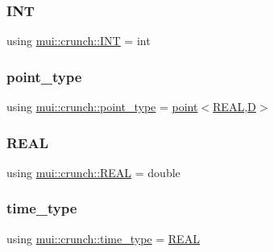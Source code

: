 \subsubsection{\texorpdfstring{I\+NT}{INT}}
{\footnotesize\ttfamily using \hyperlink{structmui_1_1crunch_a85f2c6d604af24d375168cd481228b70}{mui\+::crunch\+::\+I\+NT} =  int}

\mbox{\label{structmui_1_1crunch_ae91784f5fa63d0dea1dcb4f37fe59ff5}} 
\subsubsection{\texorpdfstring{point\+\_\+type}{point\_type}}
{\footnotesize\ttfamily using \hyperlink{structmui_1_1crunch_ae91784f5fa63d0dea1dcb4f37fe59ff5}{mui\+::crunch\+::point\+\_\+type} =  \hyperlink{structmui_1_1point}{point}$<$\hyperlink{structmui_1_1crunch_a6f2cbcc30446f242a8e0a99400d29b69}{R\+E\+AL},\hyperlink{structmui_1_1crunch_afa49250ca88779f6d39c0ab585120c2b}{D}$>$}

\mbox{\label{structmui_1_1crunch_a6f2cbcc30446f242a8e0a99400d29b69}} 
\subsubsection{\texorpdfstring{R\+E\+AL}{REAL}}
{\footnotesize\ttfamily using \hyperlink{structmui_1_1crunch_a6f2cbcc30446f242a8e0a99400d29b69}{mui\+::crunch\+::\+R\+E\+AL} =  double}

\mbox{\label{structmui_1_1crunch_a6967823168cabd179daab1d81f817eba}} 
\subsubsection{\texorpdfstring{time\+\_\+type}{time\_type}}
{\footnotesize\ttfamily using \hyperlink{structmui_1_1crunch_a6967823168cabd179daab1d81f817eba}{mui\+::crunch\+::time\+\_\+type} =  \hyperlink{structmui_1_1crunch_a6f2cbcc30446f242a8e0a99400d29b69}{R\+E\+AL}}



